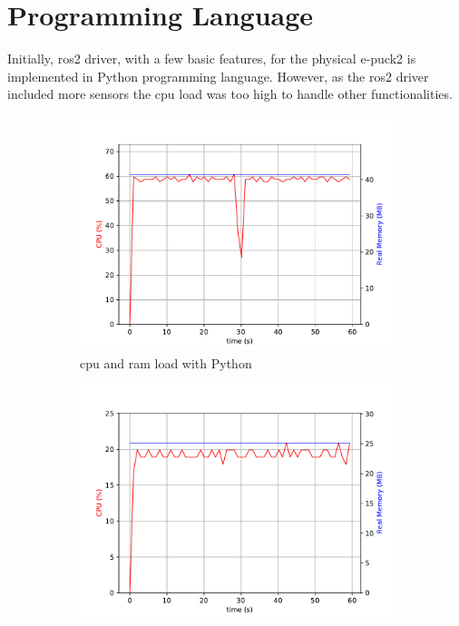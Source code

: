 
\section{Programming Language}
Initially, \ac{ros2} driver, with a few basic features, for the physical e-puck2 is implemented in Python programming language.
However, as the \ac{ros2} driver included more sensors the \ac{cpu} load was too high to handle other functionalities. 

\begin{figure}[H]
\centering
\begin{subfigure}{.8\textwidth}
  \centering
  \includegraphics[width=\linewidth]{physical/figures/rpi_py_32ms}
  \caption{\ac{cpu} and \ac{ram} load with Python}
  \label{fig:physical:py_vs_cpp:py}
\end{subfigure}
\begin{subfigure}{.8\textwidth}
  \centering
  \includegraphics[width=\linewidth]{physical/figures/rpi_cpp_32ms}

\end{subfigure}
\end{figure}
